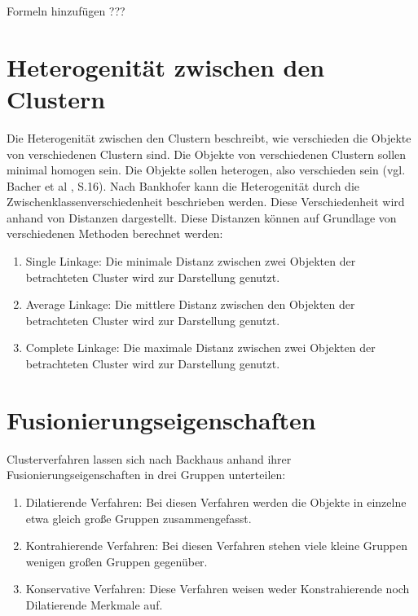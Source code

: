 Formeln hinzufügen ???
\section{Heterogenität zwischen den Clustern}
Die Heterogenität zwischen den Clustern beschreibt, wie verschieden die Objekte von verschiedenen Clustern sind. Die Objekte von verschiedenen Clustern sollen minimal homogen sein. Die Objekte sollen heterogen, also verschieden sein (vgl. Bacher et al \cite{Bacher.2010}, S.16).
Nach Bankhofer \cite{Bankhofer.2008} kann die Heterogenität durch die Zwischenklassenverschiedenheit beschrieben werden. Diese Verschiedenheit wird anhand von Distanzen dargestellt. Diese Distanzen können auf Grundlage von verschiedenen Methoden berechnet werden:
\begin{enumerate}
        \item Single Linkage: Die minimale Distanz zwischen zwei Objekten der betrachteten Cluster wird zur Darstellung genutzt.
        \item Average Linkage: Die mittlere Distanz zwischen den Objekten der betrachteten Cluster wird zur Darstellung genutzt.
        \item Complete Linkage: Die maximale Distanz zwischen zwei Objekten der betrachteten Cluster wird zur Darstellung genutzt.
\end{enumerate}

\section{Fusionierungseigenschaften}
Clusterverfahren lassen sich nach Backhaus \cite{Backhaus.2016}anhand ihrer Fusionierungseigenschaften in drei Gruppen unterteilen:
\begin{enumerate}
        \item Dilatierende Verfahren: Bei diesen Verfahren werden die Objekte in einzelne etwa gleich große Gruppen zusammengefasst.
        \item Kontrahierende Verfahren: Bei diesen Verfahren stehen viele kleine Gruppen wenigen großen Gruppen gegenüber.
        \item Konservative Verfahren: Diese Verfahren weisen weder Konstrahierende noch Dilatierende Merkmale auf.
\end{enumerate}
